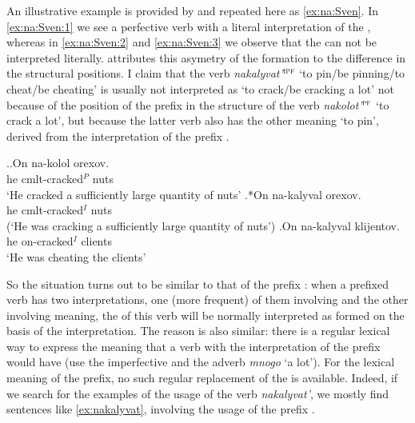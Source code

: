 An illustrative example is provided by \citet[233]{Svenonius:04b} and repeated here as \ref{ex:na:Sven}. In \ref{ex:na:Sven:1} we see a perfective verb with a literal interpretation of the , whereas in \ref{ex:na:Sven:2} and \ref{ex:na:Sven:3} we observe that the  can not be interpreted literally. \citet[233]{Svenonius:04b} attributes this asymetry of the  formation to the difference in the structural positions. I claim that the verb \textit{nakalyvat'}$^{\textsc{ipf}}$ `to pin/be pinning/to cheat/be cheating' is usually not interpreted as `to crack/be cracking a lot' not because of the position of the prefix in the structure of the verb \textit{nakolot'}$^{\textsc{pf}}$ `to crack a lot', but because the latter verb also has the other meaning `to pin', derived from the  interpretation of the prefix . 

\ex.\label{ex:na:Sven}\ag.\label{ex:na:Sven:1}On na-kolol orexov.\\
he cmlt-cracked$^P$ nuts\\
\trans `He cracked a sufficiently large quantity of nuts'
\bg.\label{ex:na:Sven:2}*On na-kalyval orexov.\\
he cmlt-cracked$^I$ nuts\\
\vspace{0.5em}
(`He was cracking a sufficiently large quantity of nuts')
\bg.\label{ex:na:Sven:3}On na-kalyval klijentov.\\
he on-cracked$^I$ clients\\
\trans `He was cheating the clients'\\

So the situation turns out to be similar to that of the  prefix : when a prefixed verb has two interpretations, one (more frequent) of them involving  and the other involving  meaning, the  of this verb will be normally interpreted as formed on the basis of the  interpretation. The reason is also similar: there is a regular lexical way to express the meaning that a  verb with the  interpretation of the prefix  would have (use the  imperfective and the adverb \textit{mnogo} `a lot'). For the lexical meaning of the prefix, no such regular replacement of the  is available. Indeed, if we search for the examples of the usage of the verb \textit{nakalyvat'}, we mostly find sentences like \ref{ex:nakalyvat}, involving the  usage of the prefix . 

